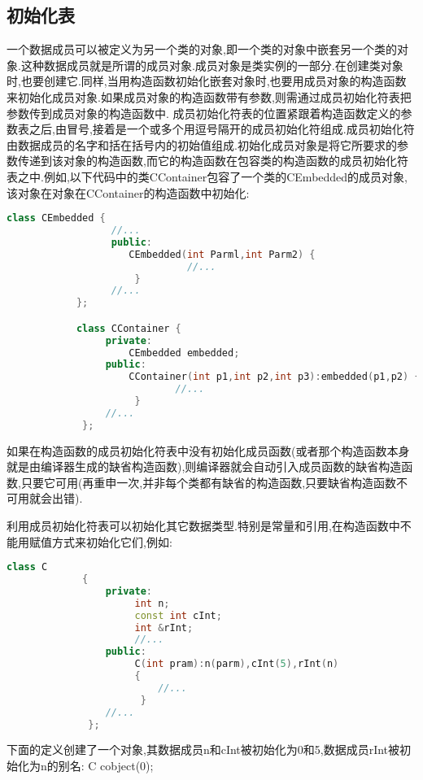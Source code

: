 \documentclass{article}
\begin{document}
\subsection{初始化表}
\label{sec-1-5}
一个数据成员可以被定义为另一个类的对象,即一个类的对象中嵌套另一个类的对象.这种数据成员就是所谓的成员对象.成员对象是类实例的一部分.在创建类对象时,也要创建它.同样,当用构造函数初始化嵌套对象时,也要用成员对象的构造函数来初始化成员对象.如果成员对象的构造函数带有参数,则需通过成员初始化符表把参数传到成员对象的构造函数中.
成员初始化符表的位置紧跟着构造函数定义的参数表之后,由冒号,接着是一个或多个用逗号隔开的成员初始化符组成.成员初始化符由数据成员的名字和括在括号内的初始值组成.初始化成员对象是将它所要求的参数传递到该对象的构造函数,而它的构造函数在包容类的构造函数的成员初始化符表之中.例如,以下代码中的类CContainer包容了一个类的CEmbedded的成员对象,该对象在对象在CContainer的构造函数中初始化:
\begin{lstlisting}[language=c++]
            class CEmbedded {            
                  //...
                  public:
                     CEmbedded(int Parml,int Parm2) {                     
                               //...
                      }
                  //...
            };

            class CContainer {            
                 private:
                     CEmbedded embedded;
                 public:
                     CContainer(int p1,int p2,int p3):embedded(p1,p2) {                     
                             //...
                      }
                 //...
             };
\end{lstlisting}
如果在构造函数的成员初始化符表中没有初始化成员函数(或者那个构造函数本身就是由编译器生成的缺省构造函数),则编译器就会自动引入成员函数的缺省构造函数,只要它可用(再重申一次,并非每个类都有缺省的构造函数,只要缺省构造函数不可用就会出错).

利用成员初始化符表可以初始化其它数据类型.特别是常量和引用,在构造函数中不能用赋值方式来初始化它们,例如:
\begin{lstlisting}[language=c++]
             class C
             {
                 private:
                      int n;
                      const int cInt;
                      int &rInt;
                      //...
                 public:
                      C(int pram):n(parm),cInt(5),rInt(n)
                      {
                          //...
                       }
                 //...
              };
\end{lstlisting}
下面的定义创建了一个对象,其数据成员n和cInt被初始化为0和5,数据成员rInt被初始化为n的别名:
    C cobject(0);
\end{document}
